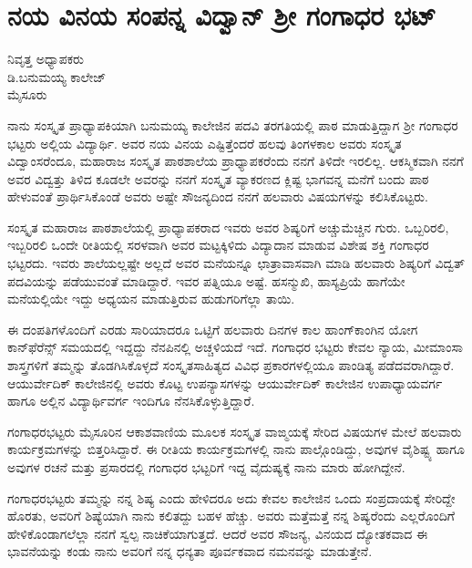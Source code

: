 \chapter{ನಯ ವಿನಯ ಸಂಪನ್ನ  ವಿದ್ವಾನ್ ಶ್ರೀ ಗಂಗಾಧರ ಭಟ್}

\begin{center}
\smallskip

ನಿವೃತ್ತ ಅಧ್ಯಾಪಕರು\\
ಡಿ.ಬನುಮಯ್ಯ ಕಾಲೇಜ್\\
ಮೈಸೂರು
\end{center}

ನಾನು ಸಂಸ್ಕೃತ ಪ್ರಾಧ್ಯಾಪಕಿಯಾಗಿ ಬನುಮಯ್ಯ ಕಾಲೇಜಿನ ಪದವಿ ತರಗತಿಯಲ್ಲಿ ಪಾಠ ಮಾಡುತ್ತಿದ್ದಾಗ ಶ್ರೀ ಗಂಗಾಧರ ಭಟ್ಟರು ಅಲ್ಲಿಯ ವಿದ್ಯಾರ್ಥಿ. ಅವರ ನಯ ವಿನಯ ಎಷ್ಟಿತ್ತೆಂದರೆ ಹಲವು ತಿಂಗಳಕಾಲ ಅವರು ಸಂಸ್ಕೃತ ವಿದ್ವಾಂಸರೆಂದೂ, ಮಹಾರಾಜ ಸಂಸ್ಕೃತ ಪಾಠಶಾಲೆಯ ಪ್ರಾಧ್ಯಾಪಕರೆಂದು ನನಗೆ ತಿಳಿದೇ ಇರಲಿಲ್ಲ. ಆಕಸ್ಮಿಕವಾಗಿ ನನಗೆ ಅವರ ವಿದ್ವತ್ತು ತಿಳಿದ ಕೂಡಲೇ ಅವರನ್ನು ನನಗೆ ಸಂಸ್ಕೃತ ವ್ಯಾಕರಣದ ಕ್ಲಿಷ್ಟ ಭಾಗವನ್ನ ಮನೆಗೆ ಬಂದು ಪಾಠ ಹೇಳುವಂತೆ ಪ್ರಾರ್ಥಿಸಿಕೊಂಡೆ ಅವರು ಅಷ್ಟೇ ಸೌಜನ್ಯದಿಂದ ನನಗೆ ಹಲವಾರು ವಿಷಯಗಳನ್ನು ಕಲಿಸಿಕೊಟ್ಟರು.

ಸಂಸ್ಕೃತ ಮಹಾರಾಜ ಪಾಠಶಾಲೆಯಲ್ಲಿ ಪ್ರಾಧ್ಯಾಪಕರಾದ ಇವರು ಅವರ ಶಿಷ್ಯರಿಗೆ ಅಚ್ಚುಮೆಚ್ಚಿನ ಗುರು. ಒಬ್ಬರಿರಲಿ, ಇಬ್ಬರಿರಲಿ ಒಂದೇ ರೀತಿಯಲ್ಲಿ ಸರಳವಾಗಿ ಅವರ ಮಟ್ಟಕ್ಕಿಳಿದು ವಿದ್ಯಾದಾನ ಮಾಡುವ ವಿಶೇಷ ಶಕ್ತಿ ಗಂಗಾಧರ ಭಟ್ಟರದು. ಇವರು ಶಾಲೆಯಲ್ಲಷ್ಟೇ ಅಲ್ಲದೆ ಅವರ ಮನೆಯನ್ನೂ ಛಾತ್ರಾವಾಸವಾಗಿ ಮಾಡಿ ಹಲವಾರು ಶಿಷ್ಯರಿಗೆ ವಿದ್ವತ್ ಪದವಿಯನ್ನು ಪಡೆಯುವಂತೆ ಮಾಡಿದ್ದಾರೆ. ಇವರ ಪತ್ನಿಯೂ ಅಷ್ಟೆ. ಹಸನ್ಮುಖಿ, ಹಾಸ್ಯಪ್ರಿಯೆ ಹಾಗೆಯೇ ಮನೆಯಲ್ಲಿಯೇ ಇದ್ದು ಅಧ್ಯಯನ ಮಾಡುತ್ತಿರುವ ಹುಡುಗರಿಗೆಲ್ಲಾ ತಾಯಿ.

ಈ ದಂಪತಿಗಳೊಂದಿಗೆ ಎರಡು ಸಾರಿಯಾದರೂ ಒಟ್ಟಿಗೆ ಹಲವಾರು ದಿನಗಳ ಕಾಲ ಹಾಂಗ್‍ಕಾಂಗಿನ ಯೋಗ ಕಾನ್‍ಫೆರೆನ್ಸ್ ಸಮಯದಲ್ಲಿ ಇದ್ದದ್ದು ನೆನಪಿನಲ್ಲಿ ಅಚ್ಚಳಿಯದೆ ಇದೆ. ಗಂಗಾಧರ ಭಟ್ಟರು ಕೇವಲ ನ್ಯಾಯ, ಮೀಮಾಂಸಾ ಶಾಸ್ತ್ರಗಳಿಗೆ ತಮ್ಮನ್ನು ತೊಡಗಿಸಿಕೊಳ್ಳದೆ ಸಂಸ್ಕೃತಸಾಹಿತ್ಯದ ವಿವಿಧ ಪ್ರಕಾರಗಳಲ್ಲಿಯೂ ಪಾಂಡಿತ್ಯ ಪಡೆದವರಾಗಿದ್ದಾರೆ. ಆಯುರ್ವೇದಿಕ್ ಕಾಲೇಜಿನಲ್ಲಿ ಅವರು ಕೊಟ್ಟ ಉಪನ್ಯಾಸಗಳನ್ನು ಆಯುರ್ವೇದಿಕ್ ಕಾಲೇಜಿನ ಉಪಾಧ್ಯಾಯವರ್ಗ ಹಾಗೂ ಅಲ್ಲಿನ ವಿದ್ಯಾರ್ಥಿವರ್ಗ ಇಂದಿಗೂ ನೆನಸಿಕೊಳ್ಳುತ್ತಿದ್ದಾರೆ.

ಗಂಗಾಧರಭಟ್ಟರು ಮೈಸೂರಿನ ಆಕಾಶವಾಣಿಯ ಮೂಲಕ ಸಂಸ್ಕೃತ ವಾಙ್ಮಯಕ್ಕೆ ಸೇರಿದ ವಿಷಯಗಳ ಮೇಲೆ ಹಲವಾರು ಕಾರ್ಯಕ್ರಮಗಳನ್ನು ಬಿತ್ತರಿಸಿದ್ದಾರೆ. ಈ ರೀತಿಯ ಕಾರ್ಯಕ್ರಮಗಳಲ್ಲಿ ನಾನು ಪಾಲ್ಗೊಂಡಿದ್ದು, ಅವುಗಳ ವೈಶಿಷ್ಟ್ಯ ಹಾಗೂ ಅವುಗಳ ರಚನೆ ಮತ್ತು ಪ್ರಸಾರದಲ್ಲಿ ಗಂಗಾಧರ ಭಟ್ಟರಿಗೆ ಇದ್ದ ವೈದುಷ್ಯಕ್ಕೆ ನಾನು ಮಾರು ಹೋಗಿದ್ದೇನೆ.

ಗಂಗಾಧರಭಟ್ಟರು ತಮ್ಮನ್ನು ನನ್ನ ಶಿಷ್ಯ ಎಂದು ಹೇಳಿದರೂ ಅದು ಕೇವಲ ಕಾಲೇಜಿನ ಒಂದು ಸಂಪ್ರದಾಯಕ್ಕೆ ಸೇರಿದ್ದೇ ಹೊರತು, ಅವರಿಗೆ ಶಿಷ್ಯೆಯಾಗಿ ನಾನು ಕಲಿತದ್ದು ಬಹಳ ಹೆಚ್ಚು. ಅವರು ಮತ್ತೆಮತ್ತೆ ನನ್ನ ಶಿಷ್ಯರೆಂದು ಎಲ್ಲರೊಂದಿಗೆ ಹೇಳಿಕೊಂಡಾಗಲೆಲ್ಲಾ ನನಗೆ ಸ್ವಲ್ಪ ನಾಚಿಕೆಯಾಗುತ್ತದೆ. ಆದರೆ ಅವರ ಸೌಜನ್ಯ, ವಿನಯದ ದ್ಯೋತಕವಾದ ಈ ಭಾವನೆಯನ್ನು ಕಂಡು ನಾನು ಅವರಿಗೆ ನನ್ನ ಧನ್ಯತಾ ಪೂರ್ವಕವಾದ ನಮನವನ್ನು ಮಾಡುತ್ತೇನೆ.

